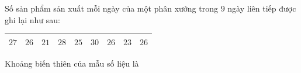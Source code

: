 \begin{ex}
Số sản phẩm sản xuất mỗi ngày của một phân xưởng trong $9$ ngày liên tiếp được ghi lại như sau:
\begin{center}
\begin{tabular}{|c|c|c|c|c|c|c|c|c|}\hline
$27$ & $26$ & $21$ & $28$ & $25$ & $30$ & $26$ & $23$ & $26$\\\hline
\end{tabular}
\end{center}
Khoảng biến thiên của mẫu số liệu là
\end{ex}
